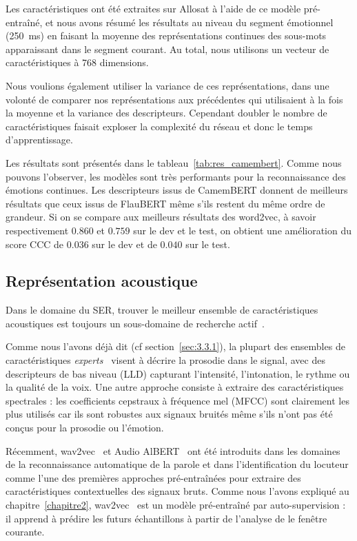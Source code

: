Les caractéristiques ont été extraites sur Allosat à l'aide de ce modèle pré-entraîné, et nous avons résumé les résultats au niveau du segment émotionnel (250~ms) en faisant la moyenne des représentations continues des sous-mots apparaissant dans le segment courant. Au total, nous utilisons un vecteur de caractéristiques à 768 dimensions.

Nous voulions également utiliser la variance de ces représentations, dans une volonté de comparer nos représentations aux précédentes qui utilisaient à la fois la moyenne et la variance des descripteurs. Cependant doubler le nombre de caractéristiques faisait exploser la complexité du réseau et donc le temps d'apprentissage.

Les résultats sont présentés dans le tableau~\ref{tab:res_camembert}. Comme nous pouvons l'observer, les modèles sont très performants pour la reconnaissance des émotions continues. Les descripteurs issus de CamemBERT donnent de meilleurs résultats que ceux issus de FlauBERT même s'ils restent du même ordre de grandeur. Si on se compare aux meilleurs résultats des word2vec, à savoir respectivement $0.860$ et $0.759$ sur le dev et le test, on obtient une amélioration du score CCC de 0$.036$ sur le dev et de $0.040$ sur le test.



\subsection{Représentation acoustique}
Dans le domaine du SER, trouver le meilleur ensemble de caractéristiques acoustiques est toujours un sous-domaine de recherche actif~\cite{Jing2018}.

Comme nous l'avons déjà dit (cf section~\ref{sec:3.3.1}), la plupart des ensembles de caractéristiques \textit{experts}~\cite{Eyben2016,Schuller2013} visent à décrire la prosodie dans le signal, avec des descripteurs de bas niveau (LLD) capturant l'intensité, l'intonation, le rythme ou la qualité de la voix.
Une autre approche consiste à extraire des caractéristiques spectrales : les coefficients cepstraux à fréquence mel (MFCC) sont clairement les plus utilisés car ils sont robustes aux signaux bruités même s'ils n'ont pas été conçus pour la prosodie ou l'émotion.

Récemment, wav2vec~\cite{Schneider2019} et Audio AlBERT~\cite{Chi2020} ont été introduits dans les domaines de la reconnaissance automatique de la parole et dans l'identification du locuteur comme l'une des premières approches pré-entraînées pour extraire des caractéristiques contextuelles des signaux bruts.
Comme nous l'avons expliqué au chapitre~\ref{chapitre2}, wav2vec~\cite{Schneider2019} est un modèle pré-entraîné par auto-supervision : il apprend à prédire les futurs échantillons à partir de l'analyse de le fenêtre courante.

